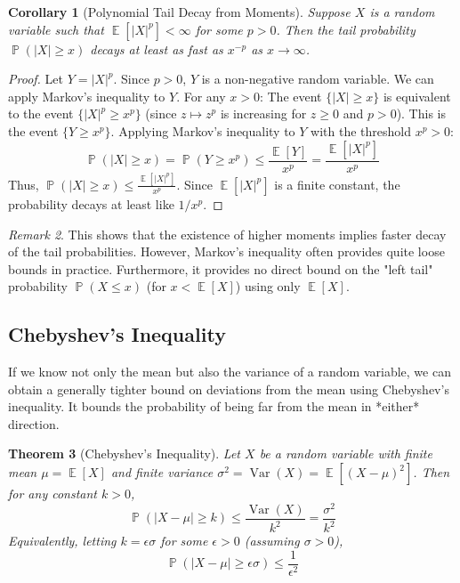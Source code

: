 \documentclass[11pt]{article}
\newtheorem{theorem}{Theorem}[section]
\newtheorem{corollary}[theorem]{Corollary}
\theoremstyle{definition}
\theoremstyle{remark}
\newtheorem{remark}[theorem]{Remark}
\DeclareMathOperator{\E}{\mathbb{E}} %
\DeclareMathOperator{\Var}{\text{Var}} %
\DeclareMathOperator{\Prob}{\mathbb{P}} %
\begin{document}
\begin{corollary}[Polynomial Tail Decay from Moments]
Suppose $X$ is a random variable such that $\E[|X|^p] < \infty$ for some $p > 0$. Then the tail probability $\Prob(|X| \ge x)$ decays at least as fast as $x^{-p}$ as $x \to \infty$.
\end{corollary}
\begin{proof}
Let $Y = |X|^p$. Since $p > 0$, $Y$ is a non-negative random variable. We can apply Markov's inequality to $Y$. For any $x > 0$:
The event $\{|X| \ge x\}$ is equivalent to the event $\{|X|^p \ge x^p\}$ (since $z \mapsto z^p$ is increasing for $z \ge 0$ and $p>0$). This is the event $\{Y \ge x^p\}$.
Applying Markov's inequality to $Y$ with the threshold $x^p > 0$:
\[
\Prob(|X| \ge x) = \Prob(Y \ge x^p) \le \frac{\E[Y]}{x^p} = \frac{\E[|X|^p]}{x^p}
\]
Thus, $\Prob(|X| \ge x) \le \frac{\E[|X|^p]}{x^p}$. Since $\E[|X|^p]$ is a finite constant, the probability decays at least like $1/x^p$.
\end{proof}
\begin{remark}
This shows that the existence of higher moments implies faster decay of the tail probabilities. However, Markov's inequality often provides quite loose bounds in practice. Furthermore, it provides no direct bound on the "left tail" probability $\Prob(X \le x)$ (for $x < \E[X]$) using only $\E[X]$.
\end{remark}

\subsection{Chebyshev's Inequality}

If we know not only the mean but also the variance of a random variable, we can obtain a generally tighter bound on deviations from the mean using Chebyshev's inequality. It bounds the probability of being far from the mean in *either* direction.

\begin{theorem}[Chebyshev's Inequality]
Let $X$ be a random variable with finite mean $\mu = \E[X]$ and finite variance $\sigma^2 = \Var(X) = \E[(X-\mu)^2]$. Then for any constant $k > 0$,
\[
\Prob(|X - \mu| \ge k) \le \frac{\Var(X)}{k^2} = \frac{\sigma^2}{k^2}
\]
Equivalently, letting $k = \epsilon \sigma$ for some $\epsilon > 0$ (assuming $\sigma > 0$),
\[
\Prob(|X - \mu| \ge \epsilon \sigma) \le \frac{1}{\epsilon^2}
\]
\end{theorem}
\end{document}
